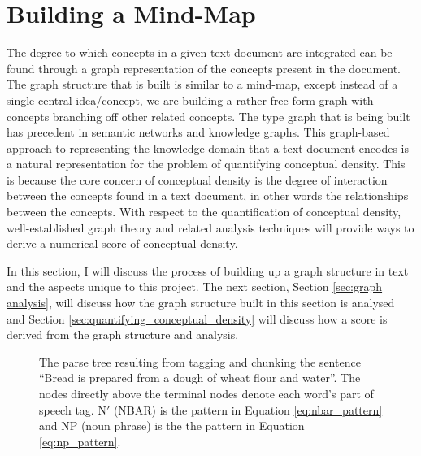 \documentclass[12pt]{article}
\begin{document}
\section{Building a Mind-Map} \label{sec:building_a_mind-map}
The degree to which concepts in a given text document are integrated can be found through a graph representation of the concepts present in the document. The graph structure that is built is similar to a mind-map, except instead of a single central idea/concept, we are building a rather free-form graph with concepts branching off other related concepts. The type graph that is being built has precedent in semantic networks and knowledge graphs. This graph-based approach to representing the knowledge domain that a text document encodes is a natural representation for the problem of quantifying conceptual density. This is because the core concern of conceptual density is the degree of interaction between the concepts found in a text document, in other words the relationships between the concepts. With respect to the quantification of conceptual density, well-established graph theory and related analysis techniques will provide ways to derive a numerical score of conceptual density. 

In this section, I will discuss the process of building up a graph structure in text and the aspects unique to this project. The next section, Section \ref{sec:graph analysis}, will discuss how the graph structure built in this section is analysed and Section \ref{sec:quantifying_conceptual_density} will discuss how a score is derived from the graph structure and analysis.

\begin{figure}
    \centering
    \caption{The parse tree resulting from tagging and chunking the sentence ``Bread is prepared from a dough of wheat flour and water''. The nodes directly above the terminal nodes denote each word's part of speech tag. N$'$ (NBAR) is the pattern in Equation \ref{eq:nbar_pattern}
    and NP (noun phrase) is the the pattern in Equation \ref{eq:np_pattern}.}
    \label{fig:parse_tree_example}
\end{figure}
\end{document}
